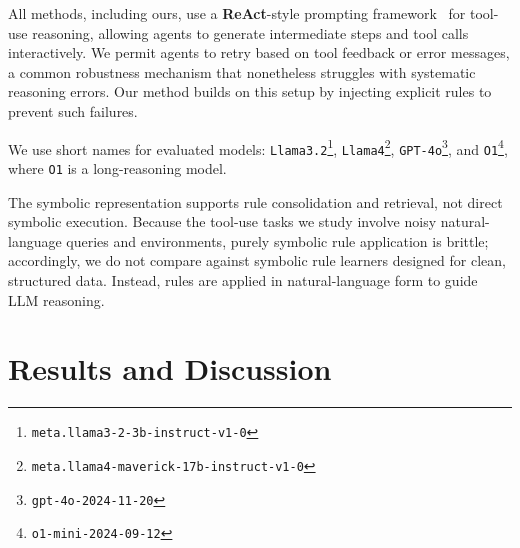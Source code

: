 \documentclass[11pt]{article}
\begin{document}

All methods, including ours, use a \textbf{ReAct}-style prompting framework~\citep{yao2023react} for tool-use
reasoning, allowing agents to generate intermediate steps and tool calls interactively.
We permit agents to retry based on tool feedback or error messages, a common robustness
mechanism that nonetheless struggles with systematic reasoning errors. Our method builds
on this setup by injecting explicit rules to prevent such failures.

We use short names for evaluated models: \texttt{Llama3.2}\footnote{\texttt{meta.llama3-2-3b-instruct-v1-0}},
\texttt{Llama4}\footnote{\texttt{meta.llama4-maverick-17b-instruct-v1-0}},
\texttt{GPT-4o}\footnote{\texttt{gpt-4o-2024-11-20}}, and \texttt{O1}\footnote{\texttt{o1-mini-2024-09-12}},
where \texttt{O1} is a long-reasoning model.

The symbolic representation supports rule consolidation and retrieval, not
direct symbolic execution. Because the tool-use tasks we study involve noisy natural-language
queries and environments, purely symbolic rule application is brittle; accordingly, we do not
compare against symbolic rule learners designed for clean, structured data\citep{quinlan1990foil, clark1989cn2, Cohen95, Furnkranz97Pruning}. Instead, rules are applied in natural-language form
to guide LLM reasoning.










\section{Results and Discussion}
\end{document}
